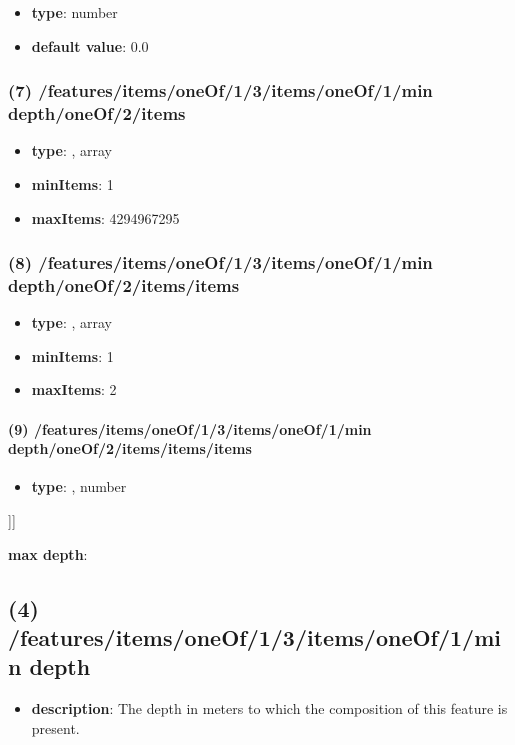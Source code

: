 \begin{itemize}[leftmargin=8em]\item {\bf type}: number\item {\bf default value}: 0.0
\end{itemize}\subsubsection{(7) /features/items/oneOf/1/3/items/oneOf/1/min depth/oneOf/2/items}
\begin{itemize}[leftmargin=7em]\item {\bf type}: , array\item {\bf minItems}: 1
\item {\bf maxItems}: 4294967295
\end{itemize}\subsubsection{(8) /features/items/oneOf/1/3/items/oneOf/1/min depth/oneOf/2/items/items}
\begin{itemize}[leftmargin=8em]\item {\bf type}: , array\item {\bf minItems}: 1
\item {\bf maxItems}: 2
\end{itemize}\paragraph{(9) /features/items/oneOf/1/3/items/oneOf/1/min depth/oneOf/2/items/items/items}
\begin{itemize}[leftmargin=9em]\item {\bf type}: , number\end{itemize}]]\item {\bf max depth}: \subsection{(4) /features/items/oneOf/1/3/items/oneOf/1/min depth}
\begin{itemize}[leftmargin=4em]\item {\bf description}: The depth in meters to which the composition of this feature is present.
\end{itemize}

